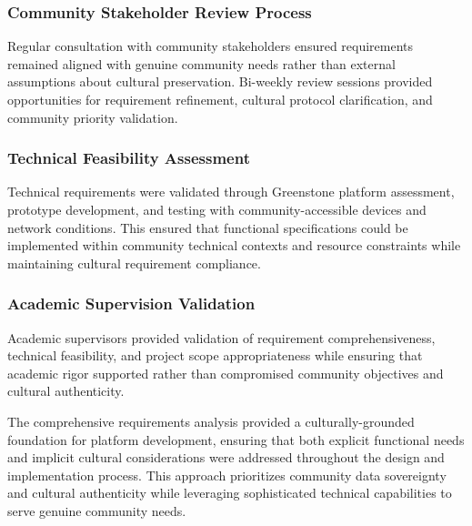 \subsubsection{Community Stakeholder Review Process}
\label{subsubsec:community_stakeholder_review}

Regular consultation with community stakeholders ensured requirements remained aligned with genuine community needs rather than external assumptions about cultural preservation. Bi-weekly review sessions provided opportunities for requirement refinement, cultural protocol clarification, and community priority validation.

\subsubsection{Technical Feasibility Assessment}
\label{subsubsec:technical_feasibility}

Technical requirements were validated through Greenstone platform assessment, prototype development, and testing with community-accessible devices and network conditions. This ensured that functional specifications could be implemented within community technical contexts and resource constraints while maintaining cultural requirement compliance.

\subsubsection{Academic Supervision Validation}
\label{subsubsec:academic_validation}

Academic supervisors provided validation of requirement comprehensiveness, technical feasibility, and project scope appropriateness while ensuring that academic rigor supported rather than compromised community objectives and cultural authenticity.

The comprehensive requirements analysis provided a culturally-grounded foundation for platform development, ensuring that both explicit functional needs and implicit cultural considerations were addressed throughout the design and implementation process. This approach prioritizes community data sovereignty and cultural authenticity while leveraging sophisticated technical capabilities to serve genuine community needs.